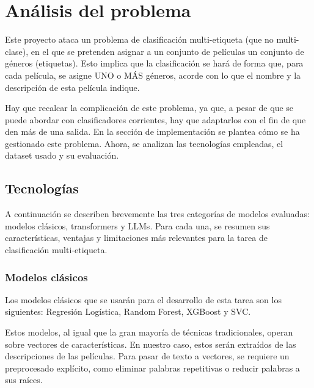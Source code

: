 \documentclass[11pt,spanish,listoffigures,listoftables]{tfgetsinf}
\begin{document}



\mainmatter
\chapter{Análisis del problema}
Este proyecto ataca un problema de clasificación multi-etiqueta (que no multi-clase), en el que se pretenden asignar a un conjunto de películas un conjunto de géneros (etiquetas). Esto implica que la clasificación se hará de forma que, para cada película, se asigne UNO o MÁS  géneros, acorde con lo que el nombre y la descripción de esta película indique.

Hay que recalcar la complicación de este problema, ya que, a pesar de que se puede abordar con clasificadores corrientes, hay que adaptarlos con el fin de que den más de una salida. En la sección de implementación se plantea cómo se ha gestionado este problema. Ahora, se analizan las tecnologías empleadas, el dataset usado y su evaluación. 

\section{Tecnologías}
A continuación se describen brevemente las tres categorías de modelos evaluadas: modelos clásicos, transformers y LLMs. Para cada una, se resumen sus características, ventajas y limitaciones más relevantes para la tarea de clasificación multi-etiqueta.

\subsection{Modelos clásicos}
Los modelos clásicos que se usarán para el desarrollo de esta tarea son los siguientes: Regresión Logística, Random Forest, XGBoost y SVC.

Estos modelos, al igual que la gran mayoría de técnicas tradicionales, operan sobre vectores de características. En nuestro caso, estos serán extraídos de las descripciones de las películas.  Para pasar de texto a vectores, se requiere un preprocesado explícito, como eliminar palabras repetitivas o reducir palabras a sus raíces. 
\end{document}
